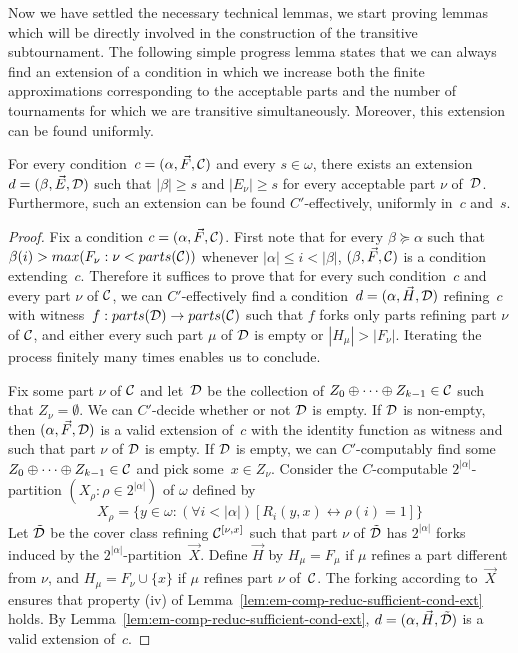 Now we have settled the necessary technical lemmas, we start proving
lemmas which will be directly involved in the construction of the transitive subtournament.
The following simple progress lemma states that we can always find an extension of a condition
in which we increase both the finite approximations corresponding to the acceptable parts 
and the number of tournaments for which we are transitive simultaneously.
Moreover, this extension can be found uniformly.

\begin{lemma}[Progress]\label{lem:em-comp-reduc-ext}
For every condition~$c = (\alpha, \vec{F}, \mathcal{C})$ and every $s \in \omega$,
there exists an extension $d = (\beta, \vec{E}, \mathcal{D})$ such that $|\beta| \geq s$ and
$|E_\nu| \geq s$ for every acceptable part $\nu$ of~$\mathcal{D}$.
Furthermore, such an extension can be found $C'$-effectively, uniformly in~$c$ and~$s$.
\end{lemma}
\begin{proof}
Fix a condition $c = (\alpha, \vec{F}, \mathcal{C})$.
First note that for every $\beta \succeq \alpha$ such that $\beta(i) > max(F_\nu : \nu < parts(\mathcal{C}))$
whenever $|\alpha| \leq i < |\beta|$, $(\beta, \vec{F}, \mathcal{C})$ is a condition extending~$c$.
Therefore it suffices to prove that for every such condition~$c$ and every part $\nu$ of $\mathcal{C}$,
we can $C'$-effectively find a condition~$d = (\alpha, \vec{H}, \mathcal{D})$ refining~$c$
with witness~$f : parts(\mathcal{D}) \to parts(\mathcal{C})$ such that $f$ forks only parts refining part $\nu$ of $\mathcal{C}$,
and either every such part $\mu$ of $\mathcal{D}$ is empty or $|H_\mu| > |F_\nu|$.
Iterating the process finitely many times enables us to conclude.

Fix some part $\nu$ of $\mathcal{C}$ and let~$\mathcal{D}$ be the collection of $Z_0 \oplus \dots \oplus Z_{k-1} \in \mathcal{C}$
such that $Z_\nu = \emptyset$. We can $C'$-decide whether or not $\mathcal{D}$ is empty.
If $\mathcal{D}$ is non-empty, then $(\alpha, \vec{F}, \mathcal{D})$ is a valid extension of~$c$
with the identity function as witness and such that part $\nu$ of $\mathcal{D}$ is empty.
If $\mathcal{D}$ is empty, we can $C'$-computably find some $Z_0 \oplus \dots \oplus Z_{k-1} \in \mathcal{C}$
and pick some~$x \in Z_\nu$.
Consider the $C$-computable $2^{|\alpha|}$-partition $(X_\rho : \rho \in 2^{|\alpha|})$ of $\omega$ defined by
$$
X_\rho = \{ y \in \omega : (\forall i < |\alpha|)[R_i(y, x) \leftrightarrow \rho(i) = 1] \} 
$$
Let $\tilde{\mathcal{D}}$ be the cover class refining $\mathcal{C}^{[\nu, x]}$ such that
part $\nu$ of $\tilde{\mathcal{D}}$ has $2^{|\alpha|}$ forks induced by the
$2^{|\alpha|}$-partition~$\vec{X}$. Define $\vec{H}$ by
$H_\mu = F_\mu$ if $\mu$ refines a part different from $\nu$,
and $H_\mu = F_\nu \cup \{x\}$ if $\mu$ refines part $\nu$ of~$\mathcal{C}$.
The forking according to~$\vec{X}$ ensures that property (iv) of Lemma~\ref{lem:em-comp-reduc-sufficient-cond-ext} holds.
By Lemma~\ref{lem:em-comp-reduc-sufficient-cond-ext}, $d = (\alpha, \vec{H}, \tilde{\mathcal{D}})$ is a valid extension of~$c$.
\end{proof}

